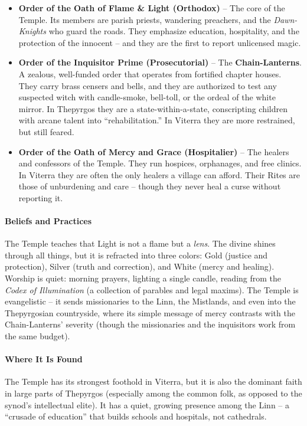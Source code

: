 \begin{itemize}
  \item \textbf{Order of the Oath of Flame \& Light (Orthodox)} -- The core of the Temple. Its members are parish priests, wandering preachers, and the \textit{Dawn-Knights} who guard the roads. They emphasize education, hospitality, and the protection of the innocent -- and they are the first to report unlicensed magic.
  \item \textbf{Order of the Inquisitor Prime (Prosecutorial)} -- The \textbf{Chain-Lanterns}. A zealous, well-funded order that operates from fortified chapter houses. They carry brass censers and bells, and they are authorized to test any suspected witch with candle-smoke, bell-toll, or the ordeal of the white mirror. In Thepyrgos they are a state-within-a-state, conscripting children with arcane talent into ``rehabilitation.'' In Viterra they are more restrained, but still feared.
  \item \textbf{Order of the Oath of Mercy and Grace (Hospitalier)} -- The healers and confessors of the Temple. They run hospices, orphanages, and free clinics. In Viterra they are often the only healers a village can afford. Their Rites are those of unburdening and care -- though they never heal a curse without reporting it.
\end{itemize}

\paragraph{Beliefs and Practices}
The Temple teaches that Light is not a flame but a \textit{lens}. The divine shines through all things, but it is refracted into three colors: Gold (justice and protection), Silver (truth and correction), and White (mercy and healing). Worship is quiet: morning prayers, lighting a single candle, reading from the \textit{Codex of Illumination} (a collection of parables and legal maxims). The Temple is evangelistic -- it sends missionaries to the Linn, the Mistlands, and even into the Thepyrgosian countryside, where its simple message of mercy contrasts with the Chain-Lanterns' severity (though the missionaries and the inquisitors work from the same budget).

\paragraph{Where It Is Found}
The Temple has its strongest foothold in Viterra, but it is also the dominant faith in large parts of Thepyrgos (especially among the common folk, as opposed to the synod's intellectual elite). It has a quiet, growing presence among the Linn -- a ``crusade of education'' that builds schools and hospitals, not cathedrals.

